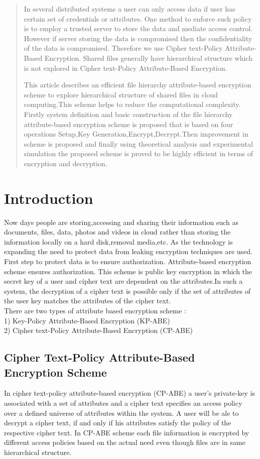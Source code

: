 \documentclass[a4paper,12pt]{article}
\begin{document}
\begin{abstract}In several distributed systems a user can only access data if user has certain set of credentials or attributes. One method to enforce such policy is to employ a trusted server to store the data and mediate access control. However if server storing the data is compromised then the confidentiality of the data is compromised. Therefore we use Cipher text-Policy Attribute-Based Encryption\cite{1a}. Shared files generally have hierarchical structure which is not explored in Cipher text-Policy Attribute-Based Encryption. 

This article describes an efficient file hierarchy attribute-based encryption scheme  to explore hierarchical structure of shared files in cloud computing.This scheme helps to reduce the computational complexity.  Firstly system definition and basic construction of the file hierarchy attribute-based encryption scheme is proposed that is based on four operations Setup,Key Generation,Encrypt,Decrypt.Then improvement in scheme is proposed and finally using theoretical analysis and experimental simulation the proposed scheme is proved to be highly efficient in terms of encryption and decryption.
\end{abstract}

\newpage
\section{Introduction}Now days people are storing,accessing and sharing their information such as documents, files, data, photos and videos in cloud rather than storing the information locally on a hard disk,removal media,etc. As the technology is expanding the need to protect data from leaking encryption techniques are used. First step to protect data is to ensure authorization. 
Attribute-based encryption scheme ensures authorization. This scheme is public key encryption in which the secret key of a user and cipher text are dependent on the attributes.In such a system, the decryption of a cipher text is possible only if the set of attributes of the user key matches the attributes of the cipher text. \\
There are two types of attribute based encryption scheme : \\ 
1) Key-Policy Attribute-Based Encryption (KP-ABE)\\
2) Cipher text-Policy Attribute-Based Encryption (CP-ABE)

\subsection{Cipher Text-Policy Attribute-Based Encryption Scheme}
In cipher text-policy attribute-based encryption (CP-ABE) a user’s private-key is associated with a set of attributes and a cipher text specifies an access policy over a defined universe of attributes within the system. A user will be ale to decrypt a cipher text, if and only if his attributes satisfy the policy of the respective cipher text.
In CP-ABE scheme each file information is encrypted by different access policies based on the actual need even though files are in same hierarchical structure.
\end{document}
